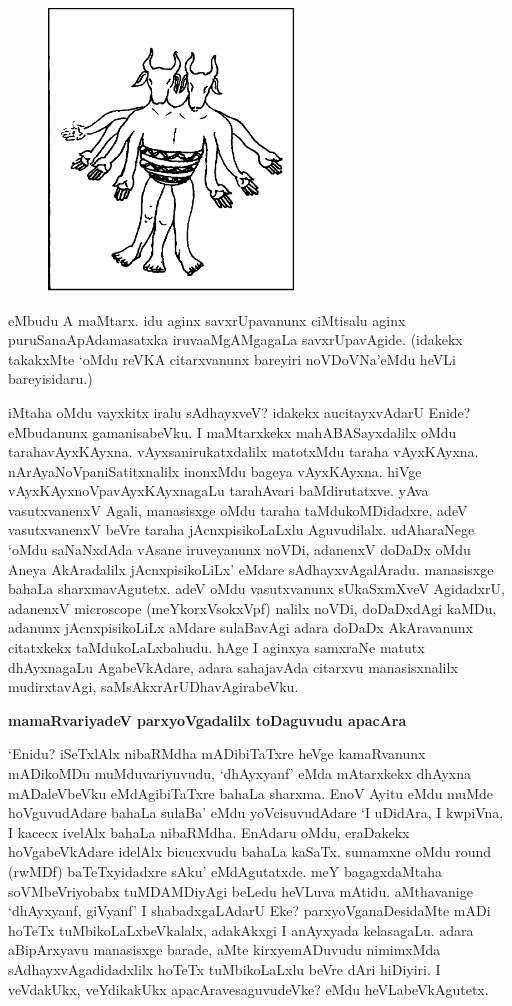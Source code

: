 \begin{figure}
\includegraphics[width=6.5cm]{0208.eps}
\end{figure}

\noindent
eMbudu A maMtarx. idu aginx savxrUpa\-vanunx ciMti\-salu aginx puruSana\break ApAda\-masatxka iruva\break aMgAMgagaLa savxrUpa\break\-vAgide. (idakekx takakxMte `oMdu reVKA citarx\-vanunx bareyiri noVDoVNa'\break eMdu heVLi bareyi\break\-sidaru.)

iMtaha oMdu vayxkitx iralu sAdhayxveV? idakekx aucitayxvAdarU Enide?\break eMbu\-danunx gama\-nisabeVku. I maMtarxkekx mahABASayx\-dalilx oMdu taraha\break vAyxKAyxna. vAyxsanirukatx\-dalilx ma\-totxMdu taraha vAyxKAyxna. nArAyaNoVpa\-niSatitxnalilx inonxMdu bageya vAyxKAyxna. hiVge vAyxKAyxnoVpavAyxKAyxnagaLu tarahAvari baMdi\-rutatxve. yAva vasutxvanenxV Agali, mana\-sisxge oMdu taraha taMdukoMDidadxre, adeV vasutx\-vanenxV beVre taraha jAcnxpisi\-koLaLxlu Aguvu\-dilalx. udAharaNege `oMdu saNaNxdAda vAsane iruve\-yanunx noVDi, adanenxV doDaDx oMdu Aneya AkAradalilx jAcnxpisikoLiLx' eMdare sAdhayxvAga\-lAradu. manasisxge bahaLa sharxmavAgutetx. adeV  oMdu vasutxvanunx sUkaSxmXveV Agi\-dadxrU, adanenxV {\rm micro\-scope} (meYkorxVsokxVpf) nalilx noVDi, doDaDxdAgi kaMDu, adanunx jAcnxpisikoLiLx aMdare sulaBa\-vAgi adara doDaDx AkAravanunx citatxkekx taMdu\-koLaLxbahudu. hAge I aginxya samxraNe matutx dhAyxnagaLu AgabeVkAdare, adara sahajavAda citarxvu manasisxnalilx mudirxtavAgi, saMsAkxrArUDhavAgirabeVku.

\newpage

{\bigskip
\noindent
{\large\bf mamaRvariyadeV parxyoVgadalilx toDaguvudu apacAra}}\label{page209}
\medskip

\noindent
`Enidu? iSeTxlAlx nibaRMdha mADibiTaTxre heVge kamaRvanunx mADikoMDu muMduvariyuvudu, `dhAyxyanf' eMda mAtarxkekx dhAyxna mADaleVbeVku eMdAgibiTaTxre bahaLa sharxma. EnoV Ayitu eMdu muMde hoVguvudAdare bahaLa sulaBa' eMdu yoVcisuvudAdare `I uDidAra, I kwpiVna, I kacecx ivelAlx bahaLa nibaRMdha. EnAdaru oMdu, eraDakekx hoVgabeVkAdare idelAlx bicucxvudu bahaLa kaSaTx. sumamxne oMdu {\rm round} (rwMDf) baTeTxyidadxre sAku' eMdAgutatxde. meY bagagxdaMtaha soVMbeVri\-yobabx tuMDAMDiyAgi beLedu heVLuva mAtidu. aMthavanige `dhAyxyanf, giVyanf' I shabadxgaLAdarU Eke? parxyoVganaDesidaMte mADi hoTeTx tuMbikoLaLxbeVkalalx, adakAkxgi I anAyxyada kelasagaLu. adara aBi\-pArxyavu manasisxge barade, aMte kirxyemADuvudu nimimxMda sAdhayxvAgadidadxlilx hoTeTx tuMbikoLaLxlu beVre dAri hiDiyiri. I veVdakUkx, veYdikakUkx apacAravesaguvudeVke? eMdu heVLabeVkAgutetx.

